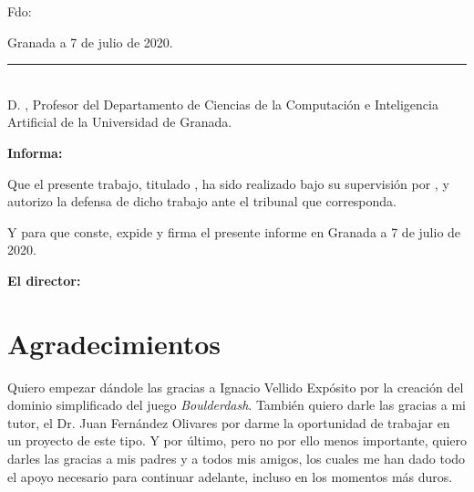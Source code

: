 \vspace{6cm}

\noindent Fdo: \autor

\vspace{2cm}

\begin{flushright}
Granada a 7 de julio de 2020.
\end{flushright}


\cleardoublepage
\thispagestyle{empty}

\noindent\rule[-1ex]{\textwidth}{2pt}\\[4.5ex]

D. \textbf{\director}, Profesor del Departamento de Ciencias de la Computación e Inteligencia Artificial
de la Universidad de Granada.


\vspace{0.5cm}

\textbf{Informa:}

\vspace{0.5cm}

Que el presente trabajo, titulado \textit{\textbf{\titulo}},
ha sido realizado bajo su supervisión por \textbf{\autor}, y autorizo la defensa de dicho trabajo ante el tribunal
que corresponda.

\vspace{0.5cm}

Y para que conste, expide y firma el presente informe en Granada a 7 de julio de 2020.

\vspace{1cm}

\textbf{El director:}

\vspace{5cm}

\noindent \textbf{\director{} }

\chapter*{Agradecimientos}
\thispagestyle{empty}

       \vspace{1cm}


Quiero empezar dándole las gracias a Ignacio Vellido Expósito por la creación del dominio
simplificado del juego \textit{Boulderdash}. También quiero darle las gracias a mi tutor,
el Dr. Juan Fernández Olivares por darme la oportunidad de trabajar en un proyecto de este tipo.
Y por último, pero no por ello menos importante, quiero darles las gracias a mis padres y a todos
mis amigos, los cuales me han dado todo el apoyo necesario para continuar adelante, incluso
en los momentos más duros.
